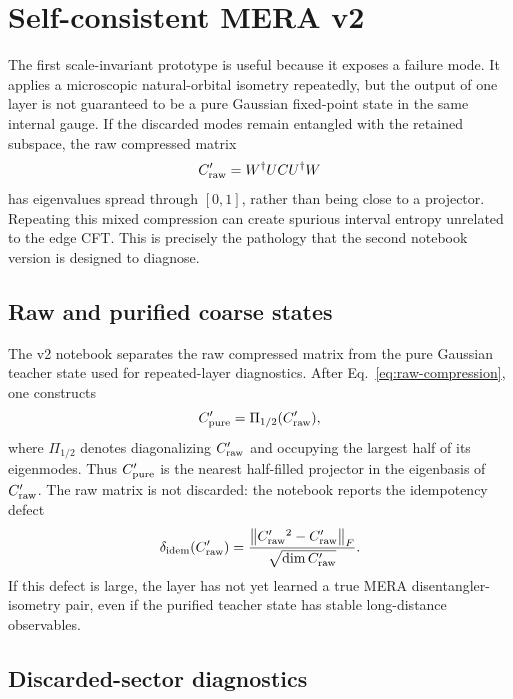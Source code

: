 \documentclass[aps,prb,twocolumn,floatfix]{revtex4-2}
\begin{document}
\section{Self-consistent MERA v2}

The first scale-invariant prototype is useful because it exposes a failure mode.
It applies a microscopic natural-orbital isometry repeatedly, but the output of
one layer is not guaranteed to be a pure Gaussian fixed-point state in the same
internal gauge.  If the discarded modes remain entangled with the retained
subspace, the raw compressed matrix
\begin{equation}
  C_{\rm raw}'=W^\dagger U C U^\dagger W
  \label{eq:raw-compression}
\end{equation}
has eigenvalues spread through \([0,1]\), rather than being close to a
projector.  Repeating this mixed compression can create spurious interval
entropy unrelated to the edge CFT.  This is precisely the pathology that the
second notebook version is designed to diagnose.

\subsection{Raw and purified coarse states}

The v2 notebook separates the raw compressed matrix from the pure Gaussian
teacher state used for repeated-layer diagnostics.  After Eq.~\eqref{eq:raw-compression},
one constructs
\begin{equation}
  C_{\rm pure}'=\Pi_{1/2}(C_{\rm raw}'),
  \label{eq:pure-projection}
\end{equation}
where \(\Pi_{1/2}\) denotes diagonalizing \(C_{\rm raw}'\) and occupying the
largest half of its eigenmodes.  Thus \(C_{\rm pure}'\) is the nearest
half-filled projector in the eigenbasis of \(C_{\rm raw}'\).  The raw matrix is
not discarded: the notebook reports the idempotency defect
\begin{equation}
  \delta_{\rm idem}(C_{\rm raw}')
  =
  \frac{\left\|C_{\rm raw}'{}^2-C_{\rm raw}'\right\|_F}
       {\sqrt{\dim C_{\rm raw}'}}.
  \label{eq:idem-defect}
\end{equation}
If this defect is large, the layer has not yet learned a true MERA
disentangler-isometry pair, even if the purified teacher state has stable
long-distance observables.

\subsection{Discarded-sector diagnostics}
\end{document}
